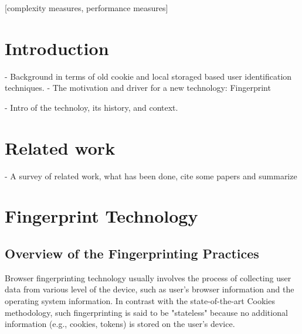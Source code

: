 \documentclass{acm_proc_article-sp}
\begin{document}

[complexity measures, performance measures]



\section{Introduction}
- Background in terms of old cookie and local storaged based user identification techniques.
- The motivation and driver for a new technology: Fingerprint

- Intro of the technoloy, its history, and context.

\section{Related work}
- A survey of related work, what has been done, cite some papers and summarize 

\section{Fingerprint Technology}

\subsection{Overview of the Fingerprinting Practices}
Browser fingerprinting technology usually involves the process of collecting user data from various level of the device, such as user's browser information and the operating system information. \cite{pierre:beauty}
In contrast with the state-of-the-art Cookies methodology, such fingerprinting is said to be "stateless" because no additional information (e.g., cookies, tokens) is stored on the user's device. 
\end{document}
